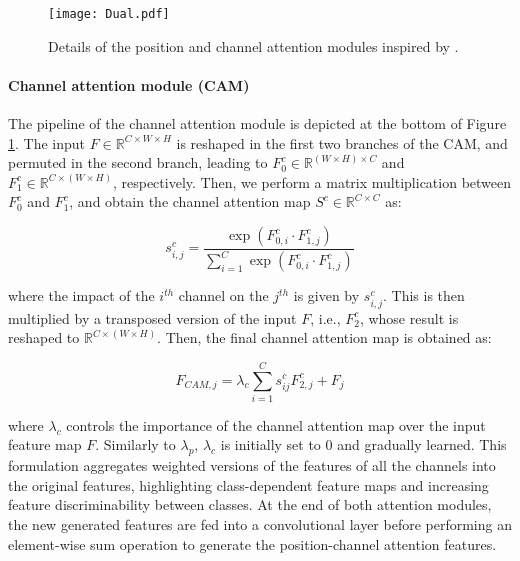 \documentclass[journal]{IEEEtran}
\begin{document}
\begin{figure}[h!]
    \centering
    \texttt{[image: Dual.pdf]}
    \caption{Details of the position and channel attention modules inspired by \cite{fu2018dual}.}
    \label{fig:dual}
\end{figure}



\paragraph*{\textbf{Channel attention module (CAM)}}
The pipeline of the channel attention module is depicted at the bottom of Figure \ref{fig:dual}. The input $F \in \mathbb{R}^{C\times W\times H}$ is reshaped in the first two branches of the CAM, and permuted in the second branch, leading to $F_{0}^c \in \mathbb{R}^{(W\times H)\times C}$ and 
$F_{1}^c \in \mathbb{R}^{C \times (W\times H)}$, respectively. Then, we perform a matrix multiplication between $F_{0}^c$ and $F_{1}^c$, and obtain the channel attention map $S^c \in \mathbb{R}^{C \times C}$ as: 

\begin{equation}
    s_{i,j}^c = \frac{\exp{(F_{0,i}^c \cdot F_{1,j}^c)}}{\sum_{i=1}^{C}\exp{(F_{0,i}^c \cdot F_{1,j}^c)}}
\end{equation}

where the impact of the $i^{th}$ channel on the $j^{th}$ is given by $s_{i,j}^c$. This is then multiplied by a transposed version of the input $F$, i.e., $F_2^c$, whose result is reshaped to $\mathbb{R}^{C \times (W\times H)}$. Then, the final channel attention map is obtained as:

\begin{equation}
    F_{CAM,j} = \lambda_c\sum_{i=1}^{C}s_{ij}^cF_{2,j}^c + F_j
\end{equation}

where $\lambda_c$ controls the importance of the channel attention map over the input feature map $F$. Similarly to $\lambda_p$, $\lambda_c$ is initially set to 0 and gradually learned. This formulation aggregates weighted versions of the features of all the channels into the original features, highlighting class-dependent feature maps and increasing feature discriminability between classes. At the end of both attention modules, the new generated features are fed into a convolutional layer before performing an element-wise sum operation to generate the position-channel attention features.
\end{document}
